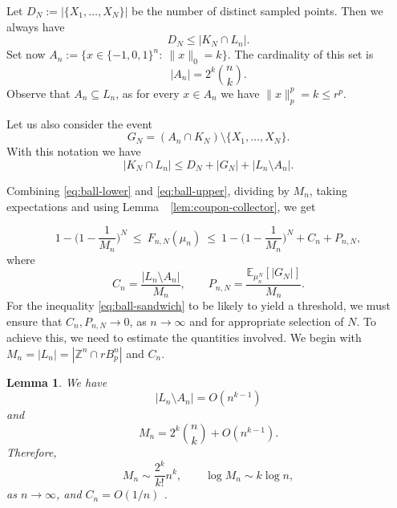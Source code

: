 \documentclass[11pt,a4paper]{article} %
\newtheorem{lemma}[theorem]{Lemma}
\theoremstyle{definition}
\theoremstyle{remark}
\newcommand{\1}{\mathds{1}}
\begin{document}
\medskip



Let $D_N:=|\{X_1,\dots,X_N\}|$ be the number of distinct sampled points.
Then we always have 
\begin{equation}\label{eq:ball-lower}
    D_N\le |K_N\cap L_n|.
\end{equation}
Set now $A_n:=\{x\in\{-1,0,1\}^n:\ \|x\|_0=k\}$. The cardinality of this set  is\begin{equation}\label{eq:An-cardinality}
|A_n|=2^k\binom{n}{k}.
\end{equation}
Observe that $A_n \subseteq L_n$, as for every $x \in A_n$ we have $\|x\|_p^p=k \leq r^p$.

Let us also consider the event $$G_N=(A_n \cap K_N)\setminus\{X_1,\ldots,X_N\}. $$ With this notation we have 
\begin{equation}\label{eq:ball-upper}
    |K_N\cap L_n|\leq D_N + |G_N|+|L_n\setminus A_n|.
\end{equation}

Combining \eqref{eq:ball-lower} and \eqref{eq:ball-upper}, dividing by $M_n$, taking expectations and using Lemma~~\ref{lem:coupon-collector}, we get

\begin{equation}\label{eq:ball-sandwich}
1-\Big(1-\frac{1}{M_n}\Big)^N
\ \le\
F_{n,N}(\mu_n)
\ \le\
1-\Big(1-\frac{1}{M_n}\Big)^N +C_n+P_{n,N},
\end{equation}
where $$C_n=\frac{|L_n \setminus A_n|}{M_n}, \qquad P_{n,N}=\frac{\mathbb{E}_{\mu_n^N}[|G_N|]}{M_n}.$$
For the inequality \eqref{eq:ball-sandwich} to be likely to yield a threshold, we must ensure that $C_n, P_{n,N} \to 0$, as $n \to \infty$ and for appropriate selection of $N$. To achieve this, we need to estimate the quantities involved. We begin with $M_n=|L_n|=|\mathbb{Z}^n \cap rB_p^n|$ and $C_n$.

\begin{lemma}\label{lem:Mn-Cn-asympt}
We have $$|L_n \setminus A_n|=O(n^{k-1})$$ and
\[
M_n = 2^k\binom{n}{k} + O(n^{k-1}).
\] Therefore, $$M_n \sim \frac{2^k}{k!}n^k, \qquad \log M_n \sim k \log n,$$ as $n \to \infty$, and $C_n=O(1/n)$ .
\end{lemma}
\end{document}
